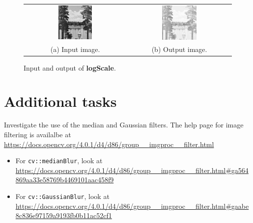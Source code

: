 \documentclass[english,a4paper,12pt,oneside]{article}
\begin{document}
        \begin {figure}[htb]
	\centering
	\begin{tabular}{cc}
		\includegraphics[width=0.35\textwidth]{lake}&
		\includegraphics[width=0.35\textwidth]{lake_log}\\
		(a) Input image. & (b) Output image.
	\end{tabular}
      \caption{\label{fig:logFilter}Input and output of \textbf{logScale}.}
    \end {figure}

    
\section{Additional tasks}

Investigate the use of the median and Gaussian filters. 
The help page for image filtering is availalbe at \url{https://docs.opencv.org/4.0.1/d4/d86/group__imgproc__filter.html}

\begin{itemize}
	\item For \verb|cv::medianBlur|, look at\\ \url{https://docs.opencv.org/4.0.1/d4/d86/group__imgproc__filter.html#ga564869aa33e58769b4469101aac458f9} 
	\item For \verb|cv::GaussianBlur|, look at \url{https://docs.opencv.org/4.0.1/d4/d86/group__imgproc__filter.html#gaabe8c836e97159a9193fb0b11ac52cf1}
\end{itemize}


\end{document}
